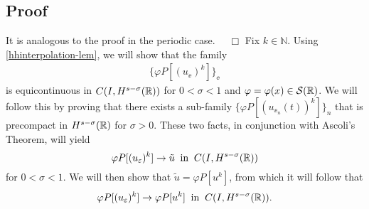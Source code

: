 \subsection{Proof} It is analogous to the proof in the periodic case.
$\quad \Box$
Fix $k \in \mathbb{N}$. Using \cref{hhinterpolation-lem}, we
will show that the family
\begin{equation*}
\begin{split}
\{\varphi P[(u_\ee)^k]\}_\ee
\end{split}
\end{equation*}
is equicontinuous in $C(I, H^{s-\sigma}(\mathbb{R}))$ 
for $0 < \sigma < 1$ and $\varphi = \varphi(x) \in \mathcal{S}(\mathbb{R})$.
We will follow this by proving that
there exists a sub-family $\{\varphi P[(u_{\ee_n}(t))^k]\}_n$
that is precompact in $H^{s-\sigma}(\mathbb{R})$ for $\sigma > 0$. 
These two facts, in conjunction with Ascoli's Theorem, will
yield
\begin{equation*}
\label{hhstrong-conv2}
\varphi P[(u_\varepsilon)^k] \to \tilde{u}
\; \; \text{in} \; \; C(I,H^{s-\sigma}(\mathbb{R}))
\end{equation*}
for $0 < \sigma < 1$.
We will then show that $\tilde{u} = \varphi P[u^k]$, from which it will
follow that
\begin{equation*}
\label{hhphiplus}
\begin{split}
\varphi P[(u_\varepsilon)^k] \to \varphi P[u^k]
\; \; \text{in} \; \; C(I,H^{s-\sigma}(\mathbb{R})).
\end{split}
\end{equation*}
%
%
%
%
%
